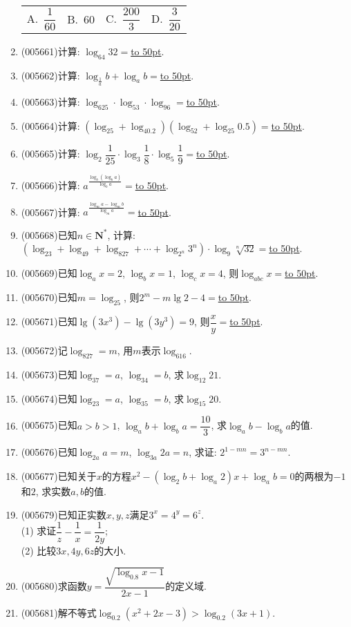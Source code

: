 \documentclass[10pt,a4paper]{article}
\newcommand{\blank}[1]{\underline{\hbox to #1pt{}}}
\newcommand{\fourch}[4]{\par\begin{tabular}{p{.23\textwidth}p{.23\textwidth}p{.23\textwidth}p{.23\textwidth}}
A.~#1 &B.~#2& C.~#3& D.~#4
\end{tabular}}
\begin{document}
\begin{enumerate}[1.]
\fourch{$\dfrac 1{60}$}{$60$}{$\dfrac{200}3$}{$\dfrac 3{20}$}
\item {\tiny (005661)}计算: $\log_{64}32=$\blank{50}.
\item {\tiny (005662)}计算: $\log_{\frac 1a}b+\log_ab=$\blank{50}.
\item {\tiny (005663)}计算: $\log_625\cdot \log_53\cdot \log_96=$\blank{50}.
\item {\tiny (005664)}计算: $(\log_25+\log_40.2)(\log_52+\log_{25}0.5)=$\blank{50}.
\item {\tiny (005665)}计算: $\log_2\dfrac 1{25}\cdot \log_3\dfrac 18\cdot \log_5\dfrac 19=$\blank{50}.
\item {\tiny (005666)}计算: $a^{\frac{\log_b(\log_ba)}{\log_ba}}=$\blank{50}.
\item {\tiny (005667)}计算: $a^{\frac{\log_ma-\log_mb}{\log_ma}}=$\blank{50}.
\item {\tiny (005668)}已知$n\in \mathbf{N}^*$, 计算: $(\log_23+\log_49+\log_827+\cdots +\log_{2^n}3^n)\cdot \log_9\sqrt [n]{32}=$\blank{50}.
\item {\tiny (005669)}已知$\log_ax=2$, $\log_bx=1$, $\log_cx=4$, 则$\log_{abc}x=$\blank{50}.
\item {\tiny (005670)}已知$m=\log_25$, 则$2^m-m\lg 2-4=$\blank{50}.
\item {\tiny (005671)}已知$\lg (3x^3)-\lg (3y^3)=9$, 则$\dfrac xy=$\blank{50}.
\item {\tiny (005672)}记$\log_827=m$, 用$m$表示$\log_616$.
\item {\tiny (005673)}已知$\log_37=a$, $\log_34=b$, 求$\log_{12}21$.
\item {\tiny (005674)}已知$\log_23=a$, $\log_35=b$, 求$\log_{15}20$.
\item {\tiny (005675)}已知$a>b>1$, $\log_ab+\log_ba=\dfrac{10}3$, 求$\log_ab-\log_ba$的值.
\item {\tiny (005676)}已知$\log_{2a}a=m$, $\log_{3a}2a=n$, 求证: $2^{1-mn}=3^{n-mn}$.
\item {\tiny (005677)}已知关于$x$的方程$x^2-(\log_2b+\log_a2)x+\log_ab=0$的两根为$-1$和$2$, 求实数$a,b$的值.
\item {\tiny (005679)}已知正实数$x,y,z$满足$3^x=4^y=6^z$.\\
(1) 求证$\dfrac 1z-\dfrac 1x=\dfrac 1{2y}$;\\
(2) 比较$3x,4y,6z$的大小.
\item {\tiny (005680)}求函数$y=\dfrac{\sqrt {\log_{0.8}x-1}}{2x-1}$的定义域.
\item {\tiny (005681)}解不等式$\log_{0.2}(x^2+2x-3)>\log_{0.2}(3x+1)$.

\end{enumerate}
\end{document}
